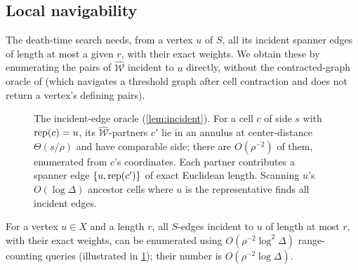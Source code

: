 \subsection{Local navigability}\label{sec:wspd-nav}

The death-time search needs, from a vertex $u$ of $S$, all its incident spanner edges of length at most a
given $r$, with their exact weights. We obtain these by enumerating the pairs of $\widehat{\mathcal W}$
incident to $u$ directly, without the contracted-graph oracle of \cite[Lemma~24]{DMOSW25} (which navigates
a threshold graph after cell contraction and does not return a vertex's defining pairs).

\begin{figure}[t]
\centering
{}
\caption{The incident-edge oracle (\cref{lem:incident}). For a cell $c$ of side $s$ with $\operatorname{rep}(c)=u$, its
$\widehat{\mathcal W}$-partners $c'$ lie in an annulus at center-distance $\Theta(s/\rho)$ and have
comparable side; there are $O(\rho^{-2})$ of them, enumerated from $c$'s coordinates. Each partner
contributes a spanner edge $\{u,\operatorname{rep}(c')\}$ of exact Euclidean length. Scanning $u$'s $O(\log\Delta)$
ancestor cells where $u$ is the representative finds all incident edges.}
\label{fig:wspd}
\end{figure}

\begin{lemma}\label{lem:incident}
For a vertex $u\in X$ and a length $r$, all $S$-edges incident to $u$ of length at most $r$, with their
exact weights, can be enumerated using $O(\rho^{-2}\log^2\Delta)$ range-counting queries (illustrated in
\cref{fig:wspd}); their number is $O(\rho^{-2}\log\Delta)$.
\end{lemma}

